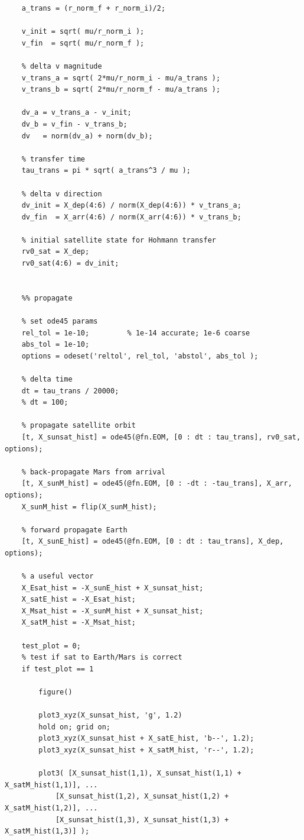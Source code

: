 \documentclass[conf]{new-aiaa}
\begin{document}
\begin{lstlisting}
    a_trans = (r_norm_f + r_norm_i)/2; 
    
    v_init = sqrt( mu/r_norm_i );
    v_fin  = sqrt( mu/r_norm_f );
    
    % delta v magnitude 
    v_trans_a = sqrt( 2*mu/r_norm_i - mu/a_trans ); 
    v_trans_b = sqrt( 2*mu/r_norm_f - mu/a_trans ); 
    
    dv_a = v_trans_a - v_init; 
    dv_b = v_fin - v_trans_b; 
    dv   = norm(dv_a) + norm(dv_b); 
    
    % transfer time 
    tau_trans = pi * sqrt( a_trans^3 / mu ); 
    
    % delta v direction 
    dv_init = X_dep(4:6) / norm(X_dep(4:6)) * v_trans_a; 
    dv_fin  = X_arr(4:6) / norm(X_arr(4:6)) * v_trans_b; 
    
    % initial satellite state for Hohmann transfer 
    rv0_sat = X_dep; 
    rv0_sat(4:6) = dv_init; 
    
    
    %% propagate 
    
    % set ode45 params 
    rel_tol = 1e-10;         % 1e-14 accurate; 1e-6 coarse 
    abs_tol = 1e-10; 
    options = odeset('reltol', rel_tol, 'abstol', abs_tol ); 
    
    % delta time 
    dt = tau_trans / 20000; 
    % dt = 100; 
    
    % propagate satellite orbit 
    [t, X_sunsat_hist] = ode45(@fn.EOM, [0 : dt : tau_trans], rv0_sat, options); 
    
    % back-propagate Mars from arrival 
    [t, X_sunM_hist] = ode45(@fn.EOM, [0 : -dt : -tau_trans], X_arr, options); 
    X_sunM_hist = flip(X_sunM_hist); 
    
    % forward propagate Earth 
    [t, X_sunE_hist] = ode45(@fn.EOM, [0 : dt : tau_trans], X_dep, options); 
    
    % a useful vector 
    X_Esat_hist = -X_sunE_hist + X_sunsat_hist; 
    X_satE_hist = -X_Esat_hist; 
    X_Msat_hist = -X_sunM_hist + X_sunsat_hist; 
    X_satM_hist = -X_Msat_hist; 
    
    test_plot = 0; 
    % test if sat to Earth/Mars is correct 
    if test_plot == 1
        
        figure()
        
        plot3_xyz(X_sunsat_hist, 'g', 1.2)
        hold on; grid on; 
        plot3_xyz(X_sunsat_hist + X_satE_hist, 'b--', 1.2); 
        plot3_xyz(X_sunsat_hist + X_satM_hist, 'r--', 1.2); 
    
        plot3( [X_sunsat_hist(1,1), X_sunsat_hist(1,1) + X_satM_hist(1,1)], ... 
            [X_sunsat_hist(1,2), X_sunsat_hist(1,2) + X_satM_hist(1,2)], ... 
            [X_sunsat_hist(1,3), X_sunsat_hist(1,3) + X_satM_hist(1,3)] ); 
        

\end{lstlisting}
\end{document}
